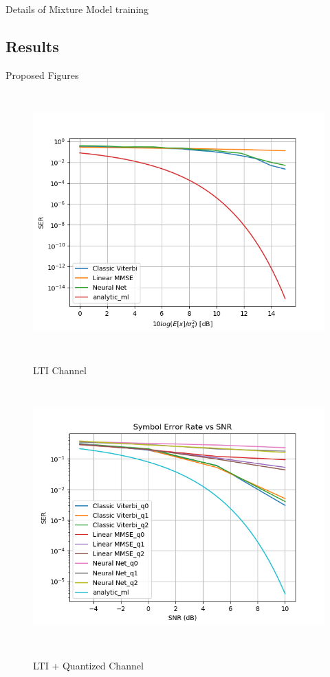 \documentclass[12pt,a4paper]{report}
\begin{document}
Details of Mixture Model training

\subsection{Results}
Proposed Figures
\begin{figure}[H]
	  \caption{LTI Channel }
	\includegraphics[width=\textwidth,height = 10cm]{results/lti_normal}
	  \label{fig:LTI Channel}
\end{figure}

\begin{figure}[H]
	  \caption{LTI + Quantized Channel }
	\includegraphics[width=\textwidth,height = 10cm]{results/lti_quantized}
	  \label{fig:LTI_quant Channel}
\end{figure}
\end{document}
